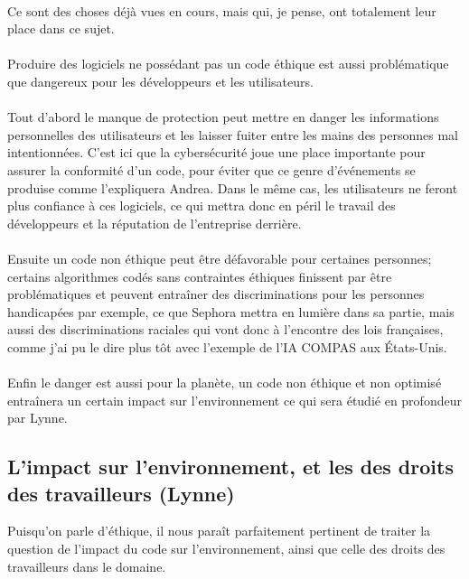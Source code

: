 \documentclass{article}
\begin{document}
\\Ce sont des choses déjà vues en cours, mais qui, je pense, ont totalement leur place dans ce sujet.\\
\\Produire des logiciels ne possédant pas un code éthique est aussi problématique que dangereux pour les développeurs et les utilisateurs.\\
\\Tout d'abord le manque de protection peut mettre en danger les informations personnelles des utilisateurs et les laisser fuiter entre les mains des personnes mal intentionnées. C'est ici que la cybersécurité joue une place importante pour assurer la conformité d'un code, pour éviter que ce genre d'événements se produise comme l'expliquera Andrea. Dans le même cas, les utilisateurs ne feront plus confiance à ces logiciels, ce qui mettra donc en péril le travail des développeurs et la réputation de l'entreprise derrière.\\
\\Ensuite un code non éthique peut être défavorable pour certaines personnes; certains algorithmes codés sans contraintes éthiques finissent par être problématiques et peuvent entraîner des discriminations pour les personnes handicapées par exemple, ce que Sephora mettra en lumière dans sa partie, mais aussi des discriminations raciales qui vont donc à l'encontre des lois françaises, comme j'ai pu le dire plus tôt avec l'exemple de l'IA COMPAS aux États-Unis.\\
\\Enfin le danger est aussi pour la planète, un code non éthique et non optimisé entraînera un certain impact sur l'environnement ce qui sera étudié en profondeur par Lynne.\\

\subsection{L'impact sur l'environnement, et les des droits des travailleurs (Lynne)} 
Puisqu’on parle d’éthique, il nous paraît parfaitement pertinent de traiter la question de l’impact du code sur l’environnement, ainsi que celle des droits des travailleurs dans le domaine.\\ 
\end{document}
